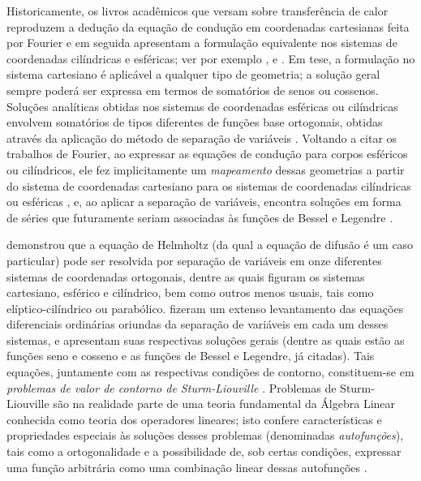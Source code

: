Historicamente, os livros acadêmicos que versam sobre transferência de calor reproduzem a dedução da equação de condução em coordenadas
cartesianas feita por Fourier e em seguida apresentam a formulação equivalente nos sistemas de coordenadas cilíndricas e esféricas; ver
por exemplo \cite{livro_carslaw}, \cite{livro_holman} e \cite{livro_ozisik}. Em tese, a formulação no sistema cartesiano é aplicável
a qualquer tipo de geometria; a solução geral sempre poderá ser expressa em termos de somatórios de senos ou cossenos. Soluções analíticas obtidas
nos sistemas de coordenadas esféricas ou cilíndricas envolvem somatórios de tipos diferentes de funções base ortogonais, obtidas através da aplicação do método
de separação de variáveis \citep{livro_boyce}. Voltando a citar os trabalhos de Fourier, ao expressar
as equações de condução para corpos esféricos ou cilíndricos, ele fez implicitamente um \textit{mapeamento} dessas geometrias a partir
do sistema de coordenadas cartesiano para os sistemas de coordenadas cilíndricas ou esféricas \citep{livro_numerical_grid}, e, ao aplicar a
separação de variáveis, encontra soluções em forma de séries que futuramente seriam associadas às funções de Bessel e Legendre \citep{livro_fourier}. 

\cite{artigo_einsenhart, artigo_einsenhart_2} demonstrou que a equação de Helmholtz (da qual a equação
de difusão é um caso particular) pode ser resolvida por separação de variáveis em onze diferentes
sistemas de coordenadas ortogonais, dentre as quais figuram os sistemas cartesiano, esférico e cilíndrico, bem como outros menos usuais, tais
como elíptico-cilíndrico ou parabólico. \cite{livro_moon} fizeram um extenso levantamento das equações diferenciais ordinárias
oriundas da separação de variáveis em cada um desses sistemas, e apresentam suas respectivas soluções gerais (dentre as quais estão as funções
seno e cosseno e as funções de Bessel e Legendre, já citadas). Tais equações, juntamente com as respectivas condições de contorno, constituem-se
em \textit{problemas de valor de contorno de Sturm-Liouville} \citep{artigo_sturm, artigo_liouville}. Problemas de Sturm-Liouville são na realidade
parte de uma teoria fundamental da Álgebra Linear conhecida como teoria dos operadores lineares; isto confere características e propriedades
especiais às soluções desses problemas (denominadas \textit{autofunções}), tais como a ortogonalidade e a possibilidade de, sob certas condições, expressar uma função arbitrária
como uma combinação linear dessas autofunções \citep{livro_boyce, livro_axler}.

